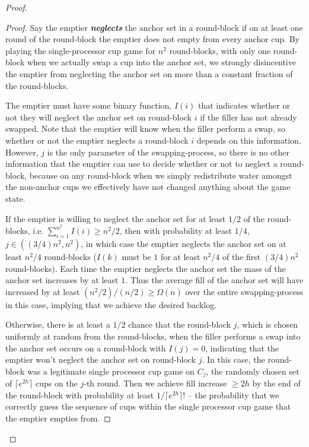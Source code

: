 \documentclass[twocolumn]{article}[10pt]
\newcommand{\defn}[1]{{\textit{\textbf{\boldmath #1}}}\xspace}
\begin{document}
\begin{proof}
\begin{proof}
  Say the emptier \defn{neglects} the anchor set in a round-block if on at
  least one round of the round-block the emptier does not empty from every
  anchor cup. By playing the single-processor cup game for $n^2$ round-blocks,
  with only one round-block when we actually swap a cup into the anchor set, we
  strongly disincentive the emptier from neglecting the anchor set on more
  than a constant fraction of the round-blocks. 

  The emptier must have some binary function, $I(i)$ that indicates whether or
  not they will neglect the anchor set on round-block $i$ if the filler has not
  already swapped. Note that the emptier will know when the filler perform a
  swap, so whether or not the emptier neglects a round-block $i$ depends on
  this information. However, $j$ is the only parameter of the swapping-process,
  so there is no other information that the emptier can use to decide whether
  or not to neglect a round-block, because on any round-block when we simply
  redistribute water amongst the non-anchor cups we effectively have not
  changed anything about the game state. 

  If the emptier is willing to neglect the anchor set for at least $1/2$ of the
  round-blocks, i.e. $\sum_{i=1}^{n^2} I(i) \ge n^2 / 2$, then with probability
  at least $1/4$, $j \in ((3/4) n^2, n^2)$, in which case the emptier neglects
  the anchor set on at least $n^2/4$ round-blocks ($I(k)$ must be $1$ for at
  least $n^2/4$ of the first $(3/4)n^2$ round-blocks). Each time the emptier
  neglects the anchor set the mass of the anchor set increases by at least $1$.
  Thus the average fill of the anchor set will have increased by at least
  $(n^2/2)/(n/2) \ge \Omega(n)$ over the entire swapping-process in this
  case, implying that we achieve the desired backlog. 

  Otherwise, there is at least a $1/2$ chance that the round-block $j$, which
  is chosen uniformly at random from the round-blocks, when the filler performs
  a swap into the anchor set occurs on a round-block with $I(j)=0$, indicating
  that the emptier won't neglect the anchor set on round-block $j$. In this
  case, the round-block was a legitimate single processor cup game on $C_j$,
  the randomly chosen set of $\lceil e^{2h} \rceil$ cups on the $j$-th round.
  Then we achieve fill increase $\ge 2h$ by the end of the round-block with
  probability at least $1/\lceil e^{2h}\rceil!$ -- the probability that we
  correctly guess the sequence of cups within the single processor cup game
  that the emptier empties from. 


\end{proof}
\end{proof}
\end{document}
